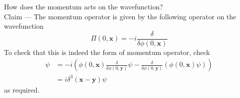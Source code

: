 \documentclass[11pt, notitlepage]{report}
\numberwithin{equation}{section}
\begin{document}
    How does the momentum acts on the wavefunction?\\
    Claim — The momentum operator is given by the following operator on the wavefunction 
    \begin{equation}
        \Pi(0, \textbf{x}) = -i\frac{\delta}{\delta\phi(0, \textbf{x})}
    \end{equation}
    To check that this is indeed the form of momentum operator, check
    \begin{align*}
        [\phi(0, \textbf{x}), \Pi(0, \textbf{y})]\psi &= -i\left( \phi(0, \textbf{x}) \frac{\delta}{\delta \phi(0, \textbf{y})} \psi - \frac{\delta}{\delta \phi(0, \textbf{y})}(\phi(0, \textbf{x}) \psi)  \right)\\
        &=i \delta^3(\textbf{x} - \textbf{y})\psi       
    \end{align*}
    as required.\\
\end{document}

